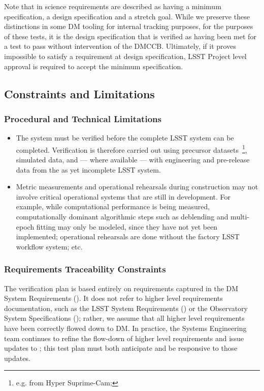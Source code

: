 Note that in  science requirements are described as having a minimum specification, a design specification and a stretch goal.
While we preserve these distinctions in some DM tooling for internal tracking purposes, for the purposes of these tests, it is the design specification that is verified as having been met for a test to pass without intervention of the DMCCB.
Ultimately, if it proves impossible to satisfy a requirement at design specification, LSST Project level approval is required to accept the minimum specification.

\subsection{Constraints and Limitations}

\subsubsection{Procedural and Technical Limitations}

\begin{itemize}


  \item{The \product{} system must be verified before the complete LSST system can be completed. Verification is therefore carried out using precursor datasets~\footnote{e.g. from Hyper Suprime-Cam; }, simulated data, and --- where available --- with engineering and pre-release data from the as yet incomplete LSST system.}

  \item{Metric measurements and operational rehearsals during construction may not involve critical operational systems that are still in development. For example, while computational performance is being measured, computationally dominant algorithmic steps such as deblending and multi-epoch fitting may only be modeled, since they have not yet been implemented; operational rehearsals are done without the factory LSST workflow system; etc.}

\end{itemize}

\subsubsection{Requirements Traceability Constraints}

The \product{} verification plan is based entirely on requirements captured in the DM System Requirements ().
It does not refer to higher level requirements documentation, such as the LSST System Requirements () or the Observatory System Specifications (); rather, we assume that all higher level requirements have been correctly flowed down to DM.
In practice, the Systems Engineering team continues to refine the flow-down of higher level requirements and issue updates to ; this test plan must both anticipate and be responsive to those updates.
